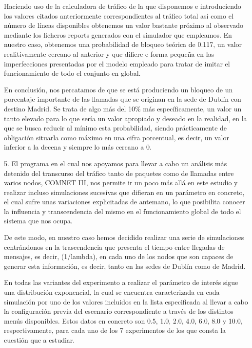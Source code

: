 Haciendo uso de la calculadora de tráfico de la que disponemos e introduciendo los valores citados anteriormente correspondientes al tráfico total así como el número de líneas disponibles obtenemos un valor bastante próximo al observado mediante los ficheros reports generados con el simulador que empleamos. En nuestro caso, obtenemos una probabilidad de bloqueo teórica de 0.117, un valor realitivamente cercano al anterior y que difiere e forma pequeña en las imperfecciones presentadas por el modelo empleado para tratar de imitar el funcionamiento de todo el conjunto en global.

En conclusión, nos percatamos de que se está produciendo un bloqueo de un porcentaje importante de las llamadas que se originan en la sede de Dublín con destino Madrid. Se trata de algo más del 10$\%$ más específicamente, un valor un tanto elevado para lo que sería un valor apropiado y deseado en la realidad, en la que se busca reducir al mínimo esta probabilidad, siendo prácticamente de obligación situarla como máximo en una cifra porcentual, es decir, un valor inferior a la decena y siempre lo más cercano a 0.

5.
El programa en el cual nos apoyamos para llevar a cabo un análisis más detenido del transcurso del tráfico tanto de paquetes como de llamadas entre varios nodos, COMNET III, nos permite ir un poco más allá en este estudio y realizar incluso simulaciones sucesivas que difieran en un parámetro en concreto, el cual sufre unas variaciones explicitadas de antemano, lo que posibilita conocer la influencia y transcendencia del mismo en el funcionamiento global de todo el sistema que nos ocupa.

De este modo, en nuestro caso hemos decidido realizar una serie de simulaciones centrándonos en la trascendencia que presenta el tiempo entre llegadas de mensajes, es decir, (1/lambda), en cada uno de los nodos que son capaces de generar esta información, es decir, tanto en las sedes de Dublín como de Madrid.

En todas las variantes del experimento a realizar el parámetro de interés sigue una distribución exponencial, la cual se encuentra caracterizada en cada simulación por uno de los valores incluidos en la lista especificada al llevar a cabo la configuración previa del escenario correspondiente a través de los distintos menús disponibles. Estos datos en concreto son 0.5, 1.0, 2.0, 4.0, 6.0, 8.0 y 10.0, respectivamente, para cada uno de los 7 experimentos de los que consta la cuestión que a estudiar.

